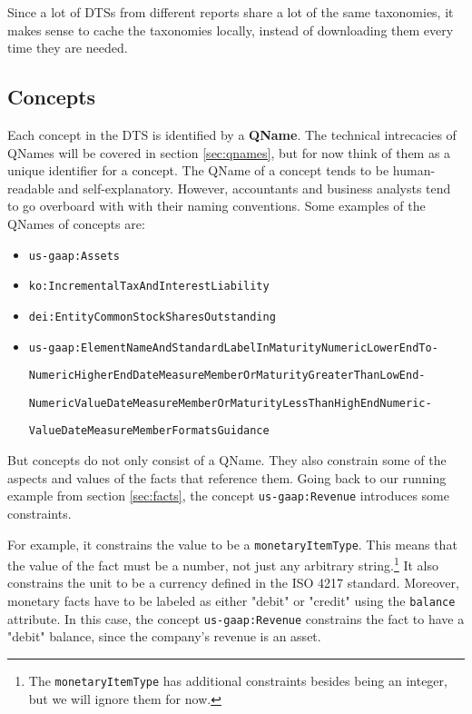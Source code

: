 Since a lot of DTSs from different reports share a lot of the same taxonomies, it makes sense to cache the taxonomies locally, 
instead of downloading them every time they are needed.

\subsection{Concepts}

Each concept in the DTS is identified by a \textbf{QName}. 
The technical intrecacies of QNames will be covered in section \ref{sec:qnames}, but for now think of them as a unique identifier for a concept.
The QName of a concept tends to be human-readable and self-explanatory. 
However, accountants and business analysts tend to go overboard with with their naming conventions.
Some examples of the QNames of concepts are:

\begin{itemize}
    \item \texttt{us-gaap:Assets}
    \item \texttt{ko:IncrementalTaxAndInterestLiability}
    \item \texttt{dei:EntityCommonStockSharesOutstanding}
    \item \texttt{us-gaap:ElementNameAndStandardLabelInMaturityNumericLowerEndTo-} 
    
    \texttt{NumericHigherEndDateMeasureMemberOrMaturityGreaterThanLowEnd-}
    
    \texttt{NumericValueDateMeasureMemberOrMaturityLessThanHighEndNumeric-}
    
    \texttt{ValueDateMeasureMemberFormatsGuidance}
\end{itemize}

But concepts do not only consist of a QName.
They also constrain some of the aspects and values of the facts that reference them.
Going back to our running example from section \ref{sec:facts}, the concept \texttt{us-gaap:Revenue} introduces some constraints.

For example, it constrains the value to be a \texttt{monetaryItemType}.
This means that the value of the fact must be a number, 
not just any arbitrary string.\footnote{The \texttt{monetaryItemType} has additional constraints besides being an integer, but we will ignore them for now.}
It also constrains the unit to be a currency defined in the ISO 4217 standard.\cite{eba2018filingrules}
Moreover, monetary facts have to be labeled as either "debit" or "credit" using the \texttt{balance} attribute.
In this case, the concept \texttt{us-gaap:Revenue} constrains the fact to have a "debit" balance, since the company's revenue is an asset.

